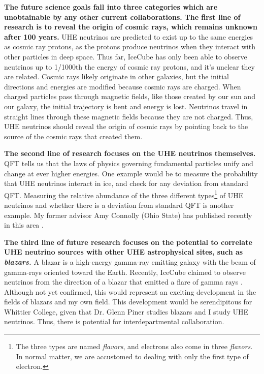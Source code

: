 \documentclass[../../main.tex]{subfiles}
\begin{document}
\textbf{The future science goals fall into three categories which are unobtainable by any other current collaborations.}  \textbf{The first line of research is to reveal the origin of cosmic rays, which remains unknown after 100 years.}  UHE neutrinos are predicted to exist up to the same energies as cosmic ray protons, as the protons produce neutrinos when they interact with other particles in deep space.  Thus far, IceCube has only been able to observe neutrinos up to 1/1000th the energy of cosmic ray protons, and it's unclear they are related.  Cosmic rays likely originate in other galaxies, but the initial directions and energies are modified because cosmic rays are charged.  When charged particles pass through magnetic fields, like those created by our sun and our galaxy, the initial trajectory is bent and energy is lost.  Neutrinos travel in straight lines through these magnetic fields because they are not charged.  Thus, UHE neutrinos should reveal the origin of cosmic rays by pointing back to the source of the cosmic rays that created them. \\ \hspace{0.1cm}

\textbf{The second line of research focuses on the UHE neutrinos themselves.}  QFT tells us that the laws of physics governing fundamental particles unify and change at ever higher energies.  One example would be to measure the probability that UHE neutrinos interact in ice, and check for any deviation from standard QFT.  Measuring the relative abundance of the three different types\footnote{The three types are named \textit{flavors}, and electrons also come in three \textit{flavors}.  In normal matter, we are accustomed to dealing with only the first type of electron.} of UHE neutrinos and whether there is a deviation from standard QFT is another example.  My former advisor Amy Connolly (Ohio State) has published recently in this area \cite{bustamante2017measurement} \cite{connolly2011calculation}. \\ \hspace{0.1cm}

\textbf{The third line of future research focuses on the potential to correlate UHE neutrino sources with other UHE astrophysical sites, such as \textit{blazars.}}  A blazar is a high-energy gamma-ray emitting galaxy with the beam of gamma-rays oriented toward the Earth.  Recently, IceCube claimed to observe neutrinos from the direction of a blazar that emitted a flare of gamma rays \cite{eaat2890}.  Although not yet confirmed, this would represent an exciting development in the fields of blazars and my own field.  This development would be serendipitous for Whittier College, given that Dr. Glenn Piner studies blazars \cite{piner2018multiepoch} and I study UHE neutrinos. Thus, there is potential for interdepartmental collaboration. \\ \hspace{0.1cm}
\end{document}
